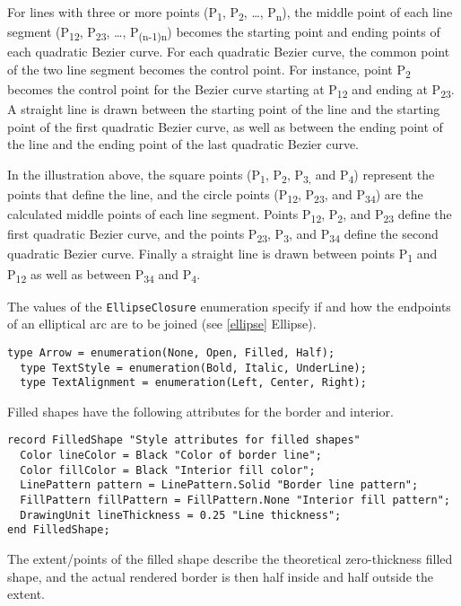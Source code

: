 For lines with three or more points (P\textsubscript{1},
P\textsubscript{2}, \ldots{}, P\textsubscript{n}), the middle point of
each line segment (P\textsubscript{12}, P\textsubscript{23}, \ldots{},
P\textsubscript{(n-1)n}) becomes the starting point and ending points of
each quadratic Bezier curve. For each quadratic Bezier curve, the common
point of the two line segment becomes the control point. For instance,
point P\textsubscript{2} becomes the control point for the Bezier curve
starting at P\textsubscript{12} and ending at P\textsubscript{23}. A
straight line is drawn between the starting point of the line and the
starting point of the first quadratic Bezier curve, as well as between
the ending point of the line and the ending point of the last quadratic
Bezier curve.

In the illustration above, the square points (P\textsubscript{1},
P\textsubscript{2}, P\textsubscript{3,} and P\textsubscript{4})
represent the points that define the line, and the circle points
(P\textsubscript{12}, P\textsubscript{23}, and P\textsubscript{34}) are
the calculated middle points of each line segment. Points
P\textsubscript{12}, P\textsubscript{2}, and P\textsubscript{23} define
the first quadratic Bezier curve, and the points P\textsubscript{23},
P\textsubscript{3}, and P\textsubscript{34} define the second quadratic
Bezier curve. Finally a straight line is drawn between points
P\textsubscript{1} and P\textsubscript{12} as well as between
P\textsubscript{34} and P\textsubscript{4}.

The values of the \lstinline!EllipseClosure! enumeration specify if and how the
endpoints of an elliptical arc are to be joined (see \autoref{ellipse} Ellipse).

\begin{lstlisting}[language=modelica]
  type Arrow = enumeration(None, Open, Filled, Half);
  type TextStyle = enumeration(Bold, Italic, UnderLine);
  type TextAlignment = enumeration(Left, Center, Right);
\end{lstlisting}
Filled shapes have the following attributes for the border and interior.

\begin{lstlisting}[language=modelica]
record FilledShape "Style attributes for filled shapes"
  Color lineColor = Black "Color of border line";
  Color fillColor = Black "Interior fill color";
  LinePattern pattern = LinePattern.Solid "Border line pattern";
  FillPattern fillPattern = FillPattern.None "Interior fill pattern";
  DrawingUnit lineThickness = 0.25 "Line thickness";
end FilledShape;
\end{lstlisting}
The extent/points of the filled shape describe the theoretical
zero-thickness filled shape, and the actual rendered border is then half
inside and half outside the extent.

